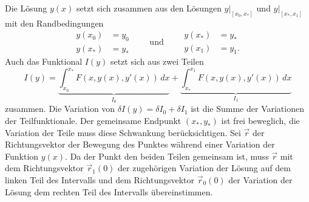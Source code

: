 Die Lösung $y(x)$ setzt sich zusammen aus den Lösungen $y|_{[x_0,x_*]}$
und $y|_{[x_*,x_1]}$ mit den Randbedingungen
\begin{equation*}
\begin{aligned}
y(x_0)&=y_0\\
y(x_*)&=y_*
\end{aligned}
\qquad\text{und}\qquad
\begin{aligned}
y(x_*)&=y_*\\
y(x_1)&=y_1.
\end{aligned}
\end{equation*}
Auch das Funktional $I(y)$ setzt sich aus zwei Teilen
\[
I(y)
=
\underbrace{
\int_{x_0}^{x_*}
F(x,y(x),y'(x))
\,dx
}_{\displaystyle I_0}
+
\underbrace{
\int_{x_*}^{x_1}
F(x,y(x),y'(x))
\,dx
}_{\displaystyle I_1}
\]
zusammen.
Die Variation von $\delta I(y)=\delta I_0+\delta I_1$ ist die Summe 
der Variationen der Teilfunktionale.
Der gemeinsame Endpunkt $(x_*,y_*)$ ist frei beweglich,
die Variation der Teile muss diese Schwankung berücksichtigen.
Sei $\vec{r}$ der Richtungsvektor der Bewegung des Punktes während
einer Variation der Funktion $y(x)$.
Da der Punkt den beiden Teilen gemeinsam ist, muss $\vec{r}$
mit dem Richtungsvektor $\vec{r}_1(0)$ der zugehörigen Variation
der Lösung auf dem linken Teil des Intervalls und dem
Richtungsvektor $\vec{r}_0(0)$ der Variation der Lösung dem rechten Teil
des Intervalls übereinstimmen.

